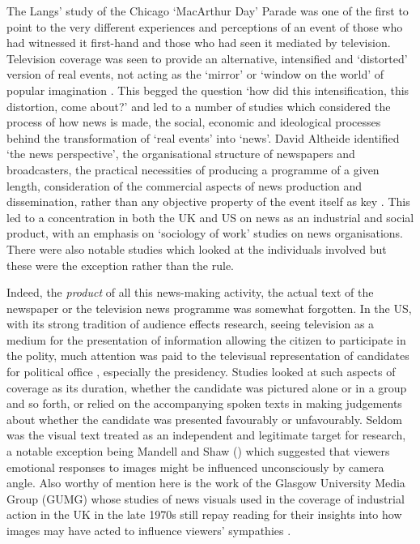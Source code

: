 The Langs' study of the Chicago `MacArthur Day' Parade was one of the first to point to the very different experiences and perceptions of an event of those who had witnessed it first-hand and those who had seen it mediated by television. Television coverage was seen to provide an alternative, intensified and `distorted' version of real events, not acting as the `mirror' or `window on the world' of popular imagination \citep{Lang:1953}. This begged the question `how did this intensification, this distortion, come about?' and led to a number of studies which considered the process of how news is made, the social, economic and ideological processes behind the transformation of `real events' into `news'. David Altheide identified `the news perspective', the organisational structure of newspapers and broadcasters, the practical necessities of producing a programme of a given length, consideration of the commercial aspects of news production and dissemination, rather than any objective property of the event itself as key \citep{Altheide:1976}. This led to a concentration in both the UK and US on news as an industrial and social product, with an emphasis on `sociology of work' studies on news organisations. There were also notable studies which looked at the individuals involved \citep[for example][]{Manning-White:1950} but these were the exception rather than the rule. 


Indeed, the \emph{product} of all this news-making activity, the actual text of the newspaper or the television news programme was somewhat forgotten. In the US, with its strong tradition of audience effects research, seeing television as a medium for the presentation of information allowing the citizen to participate in the polity, much attention was paid to the televisual representation of candidates for political office \citep[for example][]{Frank:1973a, Tiemens:1978}, especially the presidency. Studies looked at such aspects of coverage as its duration, whether the candidate was pictured alone or in a group and so forth, or relied on the accompanying spoken texts in making judgements about whether the candidate was presented favourably or unfavourably. Seldom was the visual text treated as an independent and legitimate target for research, a notable exception being Mandell and Shaw (\citeyear{Mandell:1973}) which suggested that viewers emotional responses to images might be influenced unconsciously by camera angle. Also worthy of mention here is the work of the Glasgow University Media Group (GUMG) whose studies of news visuals used in the coverage of industrial action in the UK in the late 1970s still repay reading for their insights into how images may have acted to influence viewers' sympathies \citep{Eldridge:1995}.

